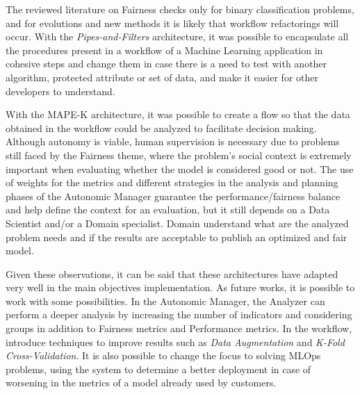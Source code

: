 \documentclass[runningheads]{llncs}
\begin{document}
The reviewed literature on Fairness checks only for binary classification problems, and for evolutions and new methods it is likely that workflow refactorings will occur. With the \textit{Pipes-and-Filters} architecture, it was possible to encapsulate all the procedures present in a workflow of a Machine Learning application in cohesive steps and change them in case there is a need to test with another algorithm, protected attribute or set of data, and make it easier for other developers to understand.

With the MAPE-K architecture, it was possible to create a flow so that the data obtained in the workflow could be analyzed to facilitate decision making. Although autonomy is viable, human supervision is necessary due to problems still faced by the Fairness theme, where the problem's social context is extremely important when evaluating whether the model is considered good or not. The use of weights for the metrics and different strategies in the analysis and planning phases of the Autonomic Manager guarantee the performance/fairness balance and help define the context for an evaluation, but it still depends on a Data Scientist and/or a Domain specialist. Domain understand what are the analyzed problem needs and if the results are acceptable to publish an optimized and fair model.

Given these observations, it can be said that these architectures have adapted very well in the main objectives implementation. As future works, it is possible to work with some possibilities. In the Autonomic Manager, the Analyzer can perform a deeper analysis by increasing the number of indicators and considering groups in addition to Fairness metrics and Performance metrics. In the workflow, introduce techniques to improve results such as \textit{Data Augmentation} and \textit{K-Fold Cross-Validation}. It is also possible to change the focus to solving MLOps problems, using the system to determine a better deployment in case of worsening in the metrics of a model already used by customers.



\end{document}

